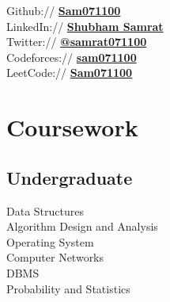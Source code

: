 \documentclass[letterpaper]{deedy-resume} %
\begin{document}
\begin{minipage}[t]{0.33\textwidth}
Github:// \href{https://github.com/Sam071100}{\bf Sam071100} \\
LinkedIn:// \href{https://www.linkedin.com/in/shubham-samrat-sam071100/}{\bf Shubham Samrat} \\
Twitter:// \href{https://twitter.com/samrat071100}{\bf @samrat071100} \\
Codeforces:// \href{https://codeforces.com/profile/Sam071100}{\bf sam071100} \\
LeetCode:// \href{https://leetcode.com/Sam071100/}{\bf Sam071100}

\sectionspace %


\section{Coursework}





\subsection{Undergraduate}

\textbullet{} Data Structures \\
\textbullet{} Algorithm Design and Analysis \\
\textbullet{} Operating System \\
\textbullet{} Computer Networks \\
\textbullet{} DBMS \\
\textbullet{} Probability and Statistics

\sectionspace %



\end{minipage}
\end{document}
